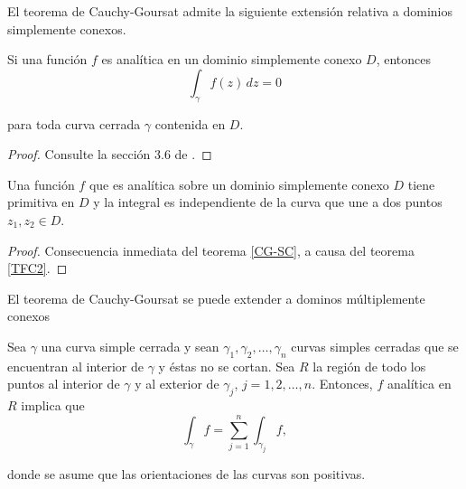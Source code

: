 El teorema de Cauchy-Goursat admite la siguiente extensión relativa a dominios simplemente conexos.

\begin{teorema} \label{CG-SC}
Si una función $f$ es analítica en un dominio simplemente conexo $D$, entonces 
$$\int_{\gamma} f(z) \,dz = 0$$

para toda curva cerrada $\gamma$ contenida en $D$.
\end{teorema}

\begin{proof}
Consulte la sección 3.6 de \cite{Asmar}.
\end{proof}

\begin{corolario}
Una función $f$ que es analítica sobre un dominio simplemente conexo $D$ tiene primitiva en $D$ y la integral es independiente de la curva que une a dos puntos $z_1,z_2 \in D$.
\end{corolario}

\begin{proof}
Consecuencia inmediata del teorema \ref{CG-SC}, a causa del teorema \ref{TFC2}.
\end{proof}

El teorema de Cauchy-Goursat se puede extender a dominos múltiplemente conexos

\begin{teorema} \label{CGMultiConexo}
Sea $\gamma$ una curva simple cerrada y sean $\gamma_1, \gamma_2, \dots, \gamma_n$ curvas simples cerradas que se encuentran al interior de $\gamma$ y éstas no se cortan. Sea $R$ la región de todo los puntos al interior de $\gamma$ y al exterior de $\gamma_j$, $j = 1,2, \dots, n$. Entonces, $f$ analítica en $R$ implica que 
$$\int_{\gamma} f = \sum_{j=1}^n \int_{\gamma_j} f,$$

donde se asume que las orientaciones de las curvas son positivas.
\end{teorema}

